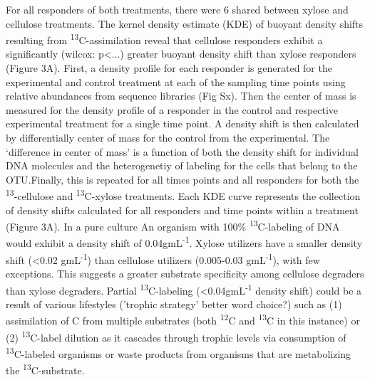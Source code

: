 For all responders of both treatments, there were 6 shared between xylose and cellulose treatments.
The kernel density estimate (KDE) of buoyant density shifts resulting from \textsuperscript{13}C-assimilation reveal that cellulose responders exhibit a significantly (wilcox: p<...) greater buoyant density shift than xylose responders (Figure 3A). First, a density profile for each responder is generated for the experimental and control treatment at each of the sampling time points using relative abundances from sequence libraries (Fig Sx). Then the center of mass is measured for the density profile of a responder in the control and respective experimental treatment for a single time point. A density shift is then calculated by differentially center of mass for the control from the experimental. The ‘difference in center of mass’ is a function of both the density shift for individual DNA molecules and the heterogenetiy of labeling for the cells that belong to the OTU.Finally, this is repeated for all times points and all responders for both the \textsuperscript{13}-cellulose and \textsuperscript{13}C-xylose treatments. Each KDE curve represents the collection of density shifts calculated for all responders and time points within a treatment (Figure 3A). In a pure culture An organism with 100\% \textsuperscript{13}C-labeling of DNA would exhibit a density shift of 0.04gmL\textsuperscript{-1}. Xylose utilizers have a smaller density shift (<0.02 gmL\textsuperscript{-1}) than cellulose utilizers (0.005-0.03 gmL\textsuperscript{-1}), with few exceptions. This suggests a greater substrate specificity among cellulose degraders than xylose degraders. Partial \textsuperscript{13}C-labeling (<0.04gmL\textsuperscript{-1} density shift) could be a result of various lifestyles ('trophic strategy' better word choice?) such as (1) assimilation of C from multiple substrates (both \textsuperscript{12}C and \textsuperscript{13}C in this instance) or (2) \textsuperscript{13}C-label dilution as it cascades through trophic levels via consumption of \textsuperscript{13}C-labeled organisms or waste products from organisms that are metabolizing the \textsuperscript{13}C-substrate.

